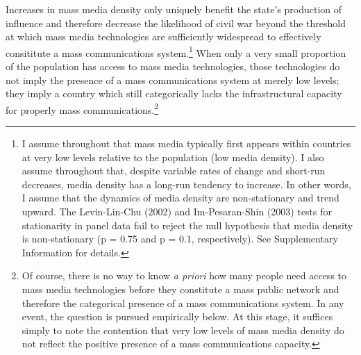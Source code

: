 \documentclass[11pt,article,oneside]{memoir}
\begin{document}
Increases in mass media density only uniquely benefit the state's
production of influence and therefore decrease the likelihood of civil
war beyond the threshold at which mass media technologies are
sufficiently widespread to effectively consititute a mass communications
system.\footnote{I assume throughout that mass media typically first
  appears within countries at very low levels relative to the population
  (low media density). I also assume throughout that, despite variable
  rates of change and short-run decreases, media density has a long-run
  tendency to increase. In other words, I assume that the dynamics of
  media density are non-stationary and trend upward. The Levin-Lin-Chu
  (2002) and Im-Pesaran-Shin (2003) tests for stationarity in panel data
  fail to reject the null hypothesis that media density is
  non-stationary (p = 0.75 and p = 0.1, respectively). See Supplementary
  Information for details.} When only a very small proportion of the
population has access to mass media technologies, those technologies do
not imply the presence of a mass communications system at merely low
levels; they imply a country which still categorically lacks the
infrastructural capacity for properly mass communications.\footnote{Of
  course, there is no way to know \emph{a priori} how many people need
  access to mass media technologies before they constitute a mass public
  network and therefore the categorical presence of a mass
  communications system. In any event, the question is pursued
  empirically below. At this stage, it suffices simply to note the
  contention that very low levels of mass media density do not reflect
  the positive presence of a mass communications capacity.}
\end{document}
